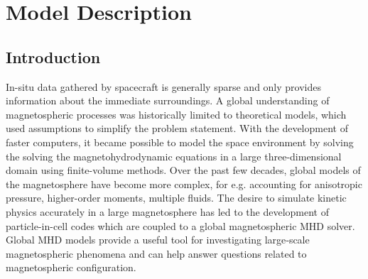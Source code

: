 
\chapter{Model Description}

\section{Introduction}

In-situ data gathered by spacecraft is generally sparse and only provides information about the immediate surroundings. A global understanding of magnetospheric processes was historically limited to theoretical models, which used assumptions to simplify the problem statement. With the development of faster computers, it became possible to model the space environment by solving the solving the magnetohydrodynamic equations in a large three-dimensional domain using finite-volume methods. Over the past few decades, global models of the magnetosphere have become more complex, for e.g. accounting for anisotropic pressure, higher-order moments, multiple fluids. The desire to simulate kinetic physics accurately in a large magnetosphere has led to the development of particle-in-cell codes which are coupled to a global magnetospheric MHD solver. Global MHD models provide a useful tool for investigating large‐scale magnetospheric phenomena and can help answer questions related to magnetospheric configuration. 

